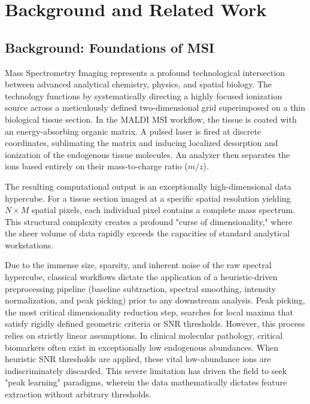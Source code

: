 \documentclass[
12pt, %
oneside, %
english, %
onehalfspacing, %
nolistspacing, %
headsepline, %
]{MastersDoctoralThesis} %
\begin{document}
\chapter{Background and Related Work}
\section{Background: Foundations of MSI}

Mass Spectrometry Imaging represents a profound technological intersection between advanced analytical chemistry, physics, and spatial biology. The technology functions by systematically directing a highly focused ionization source across a meticulously defined two-dimensional grid superimposed on a thin biological tissue section. In the MALDI MSI workflow, the tissue is coated with an energy-absorbing organic matrix. A pulsed laser is fired at discrete coordinates, sublimating the matrix and inducing localized desorption and ionization of the endogenous tissue molecules. An analyzer then separates the ions based entirely on their mass-to-charge ratio ($m/z$).\citep{caprioli1997maldi, korber2025mass}

The resulting computational output is an exceptionally high-dimensional data hypercube. For a tissue section imaged at a specific spatial resolution yielding $N \times M$ spatial pixels, each individual pixel contains a complete mass spectrum. This structural complexity creates a profound "curse of dimensionality," where the sheer volume of data rapidly exceeds the capacities of standard analytical workstations. \citep{abdelmoula2021peak, aspect2026msi_intro}

Due to the immense size, sparsity, and inherent noise of the raw spectral hypercube, classical workflows dictate the application of a heuristic-driven preprocessing pipeline (baseline subtraction, spectral smoothing, intensity normalization, and peak picking) prior to any downstream analysis. Peak picking, the most critical dimensionality reduction step, searches for local maxima that satisfy rigidly defined geometric criteria or SNR thresholds. However, this process relies on strictly linear assumptions. In clinical molecular pathology, critical biomarkers often exist in exceptionally low endogenous abundances. When heuristic SNR thresholds are applied, these vital low-abundance ions are indiscriminately discarded. This severe limitation has driven the field to seek "peak learning" paradigms, wherein the data mathematically dictates feature extraction without arbitrary thresholds. \citep{abdelmoula2021peak, buchberger2018mass}
\end{document}
